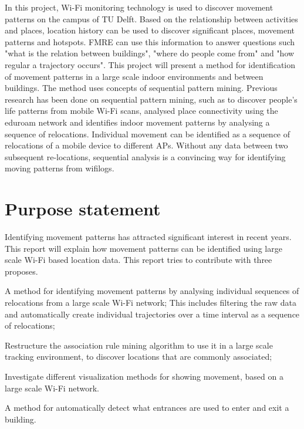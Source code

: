 In this project, Wi-Fi monitoring technology is used to discover movement
patterns on the campus of TU Delft. Based on the relationship between activities and places, location history can be used to discover significant places, movement patterns and hotspots. FMRE can use this information to answer questions such "what is the relation between buildings", "where do people come from" and "how regular a trajectory occurs". This project will present a method for identification of movement patterns in a large scale indoor environments and between buildings. The method uses concepts of sequential pattern mining. Previous research has been done on sequential pattern mining, such as \cite{zhao2014discovering} to discover people’s life patterns from mobile Wi-Fi scans, \citep{meneses2012large} analysed place connectivity using the eduroam network and \cite{radaelli2013identifying} identifies indoor movement patterns by analysing a sequence of relocations. Individual movement can be identified as a sequence of relocations of a mobile device to different APs. Without any data between two subsequent re-locations, sequential analysis is a convincing way for identifying moving patterns from wifilogs.
\section{Purpose statement}\label{purpstate}
Identifying movement patterns has attracted significant interest in recent years. This report will explain how movement patterns can be identified using large scale Wi-Fi based location data. This report tries to contribute with three proposes.
\begin {enumerate*} [label=\itshape\arabic*\upshape),font={\color{red!0!black}\bfseries}] \item A method for identifying movement patterns by analysing individual sequences of relocations from a large scale Wi-Fi network; This includes filtering the raw data and automatically create individual trajectories over a time interval as a sequence of relocations; \item Restructure the association rule mining algorithm to use it in a large scale tracking environment, to discover locations that are commonly associated; \item Investigate different visualization methods for showing movement, based on a large scale Wi-Fi network. \item A method for automatically detect what entrances are used to enter and exit a building.
\end {enumerate*}

